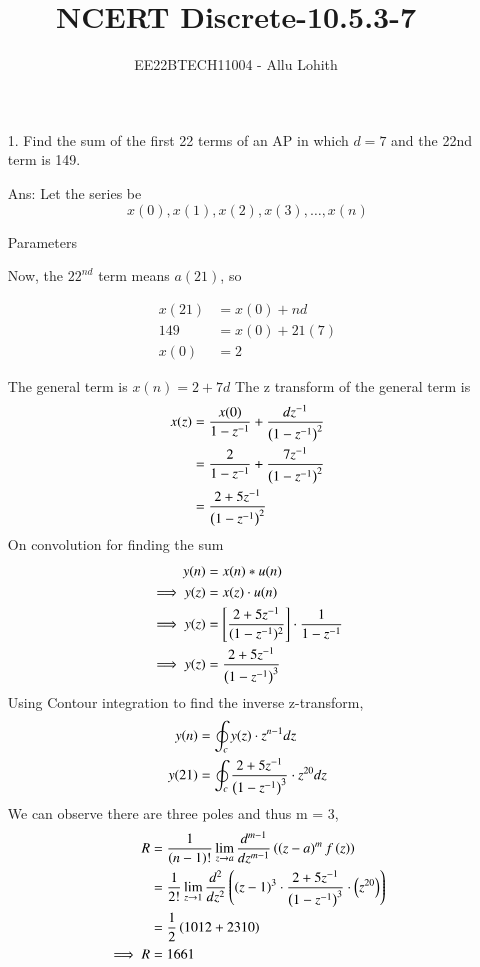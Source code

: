 \documentclass[journal,12pt,twocolumn]{IEEEtran}
\theoremstyle{remark}
\begin{document}

\vspace{3cm}

\title{NCERT Discrete-10.5.3-7}
\author{EE22BTECH11004 - Allu Lohith}

\maketitle
\newpage
\bigskip

\renewcommand{\thefigure}{\theenumi}
\renewcommand{\thetable}{\theenumi}
\begin{enumerate}
\item[1.]
Find the sum of the first 22 terms of an AP in which $d = 7$ and the 22nd term is 149.
\item[Ans:]
Let the series be $$x(0),x(1),x(2),x(3),\ldots,x(n)$$

\begin{table}[h!]
\centering

\vspace{0.5cm}
\caption{\normalsize Parameters}
\end{table}

Now, the $22^{nd}$ term means $a(21)$, so

\begin{align}
x(21) &= x(0)+nd\\
149 &= x(0)+21(7)\\
x(0) &= 2    
\end{align}

The general term is $x(n)=2+7d$
The z transform of the general term is 
\begin{align}
x(z)&= \frac{x(0)}{1-z^{-1}}+\frac{dz^{-1}}{\left(1-z^{-1}\right)^2} \\
&=\frac{2}{1-z^{-1}}+\frac{7z^{-1}}{{\left(1-z^{-1}\right)^2}}\\
&=\frac{2+5z^{-1}}{\left(1-z^{-1}\right)^2}
\end{align}
On convolution for finding the sum
\begin{align}
    y(n)&=x(n)\ast u(n)\\
    \implies y(z)&=x(z)\cdot u(n)\\
    \implies y(z)&=\left[\frac{{2+5z^{-1}}}{{(1-z^{-1})^2}}\right] \cdot \frac{1}{{1-z^{-1}}}\\
    \implies y(z)&= \frac{2+5z^{-1}}{\left(1-z^{-1}\right)^3}
\end{align}
Using Contour integration to find the inverse z-transform,
\begin{align}
    y(n)&=\oint_c y(z)\cdot z^{n-1}dz\\
    y(21)&=\oint_c \frac{2+5z^{-1}}{\left(1-z^{-1}\right)^3}\cdot z^{20}dz
\end{align}
We can observe there are three poles and thus m = 3,
\begin{align}
    R&=\frac{1}{\left(n-1\right)!} \lim_{z \to a} \frac{d^{m-1}}{dz^{m-1}}\left(\left(z-a\right)^mf\left(z\right)\right)\\
    &=\frac{1}{2!}\lim_{z \to 1} \frac{d^2}{dz^2} \left(\left(z-1\right)^3\cdot \frac{2+5z^{-1}}{\left(1-z^{-1}\right)^3}\cdot \left(z^{20}\right)\right)\\
    &=\frac{1}{2}\left(1012+2310\right)\\
    \implies R&=1661
\end{align}



\end{enumerate}
\end{document}
